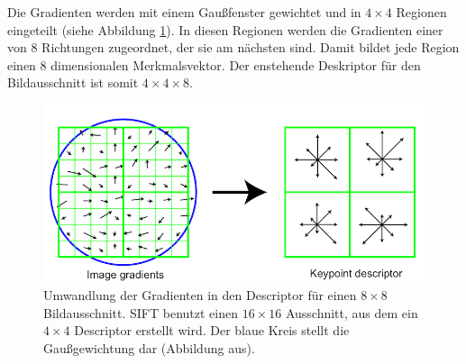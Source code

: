 Die Gradienten werden mit einem Gaußfenster gewichtet und in $4 \times 4$ Regionen eingeteilt (siehe Abbildung \ref{fig:siftDesc}). In diesen Regionen werden die Gradienten einer von 8 Richtungen zugeordnet, der sie am nächsten sind. Damit bildet jede Region einen 8 dimensionalen Merkmalsvektor. Der enstehende Deskriptor für den Bildausschnitt ist somit $4 \times 4 \times 8$.



\begin{figure}[h]
    \centering
		\includegraphics[scale=0.8]{bilder/sift_pic.png}
    	\caption{Umwandlung der Gradienten in den Descriptor für einen $8 \times 8$ Bildausschnitt. SIFT benutzt einen $16 \times 16$ Ausschnitt, aus dem ein $4 \times 4$ Descriptor erstellt wird.  Der blaue Kreis stellt die Gaußgewichtung dar (Abbildung aus\cite[S. 15]{Lowe2004}).}
 \label{fig:siftDesc}
\end{figure}

